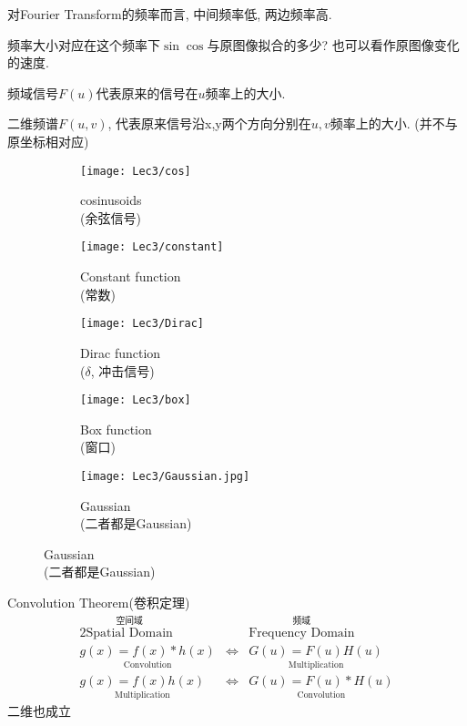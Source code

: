     对Fourier Transform的频率而言, 中间频率低, 两边频率高.

    频率大小对应在这个频率下$\sin \cos$与原图像拟合的多少? 也可以看作原图像变化的速度. 
    
    频域信号$F(u)$代表原来的信号在$u$频率上的大小.

    二维频谱$F(u,v)$, 代表原来信号沿x,y两个方向分别在$u,v$频率上的大小. (并不与原坐标相对应)

   

    \begin{figure}[H]
        \centering
        \caption{Examples(一维)}
        \begin{subfigure}{0.18\textwidth}
            \centering
            \texttt{[image: Lec3/cos]}
            \caption{cosinusoids \\(余弦信号)}
        \end{subfigure}
        \begin{subfigure}{0.18\textwidth}
            \centering
            \texttt{[image: Lec3/constant]}
            \caption{Constant function\\ (常数)}
        \end{subfigure}
        \begin{subfigure}{0.18\textwidth}
            \centering
            \texttt{[image: Lec3/Dirac]}
            \caption{Dirac function \\($\delta $, 冲击信号)}
        \end{subfigure}
        \begin{subfigure}{0.18\textwidth}
            \centering
            \texttt{[image: Lec3/box]}
            \caption{Box function \\(窗口)}
        \end{subfigure}
        \begin{subfigure}{0.18\textwidth}
            \centering
            \texttt{[image: Lec3/Gaussian.jpg]}
            \caption{Gaussian \\(二者都是Gaussian)}
        \end{subfigure}
    \end{figure}
    
    Convolution Theorem(卷积定理)
    \begin{alignat*}{2}
        \overset{\text{空间域}}{\text{Spatial Domain}}&&\overset{\text{频域}}{\text{Frequency Domain}}\\
        \underset{\text{Convolution}}{g(x)=f(x)*h(x)} &\Longleftrightarrow & \underset{\text{Multiplication}}{ G(u)=F(u)H(u)}\\
        \underset{\text{Multiplication}}{g(x)=f(x)h(x)} &\Longleftrightarrow & \underset{\text{Convolution}}{ G(u)=F(u)*H(u)}
    \end{alignat*}
    二维也成立

